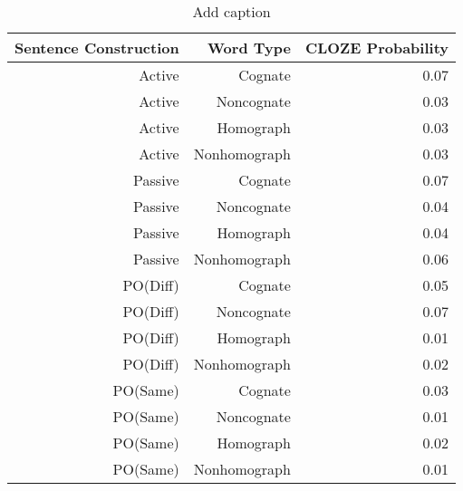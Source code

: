 \begin{table}[htbp]
  \centering
  \caption{Add caption}
    \begin{tabular}{rrr}
    \toprule
    Sentence Construction & Word Type & CLOZE Probability \\
    \midrule
    Active & Cognate & 0.07 \\
    Active & Noncognate & 0.03 \\
    Active & Homograph & 0.03 \\
    Active & Nonhomograph & 0.03 \\
    Passive & Cognate & 0.07 \\
    Passive & Noncognate & 0.04 \\
    Passive & Homograph & 0.04 \\
    Passive & Nonhomograph & 0.06 \\
    PO(Diff) & Cognate & 0.05 \\
    PO(Diff) & Noncognate & 0.07 \\
    PO(Diff) & Homograph & 0.01 \\
    PO(Diff) & Nonhomograph & 0.02 \\
    PO(Same) & Cognate & 0.03 \\
    PO(Same) & Noncognate & 0.01 \\
    PO(Same) & Homograph & 0.02 \\
    PO(Same) & Nonhomograph & 0.01 \\
    \bottomrule
    \end{tabular}%
  \label{tab:addlabel}%
\end{table}%

